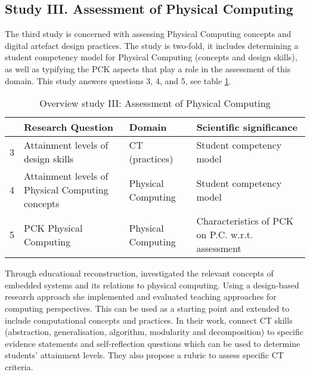 


\subsection{Study III. Assessment of Physical Computing} %

The third study is concerned with assessing Physical Computing concepts and digital artefact design practices. The study is two-fold, it includes determining a student competency model for Physical Computing (concepts and design skills), as well as typifying the PCK aspects that play a role in the assessment of this domain. This study answers questions 3, 4, and 5, see table \ref{table:StudyIIIresearchQues}.

\begin{table}
  \centering
\begin{tabular}{|c|p{50mm}|l|p{48mm}|}
   \hline
    &\textbf{Research Question} & \textbf{Domain} & \textbf{Scientific significance}\\
  \hline

  3 & Attainment levels of design skills & CT (practices) & Student competency model  \\ \hline
  4 & Attainment levels of Physical Computing concepts & Physical Computing & Student competency model\\ \hline
  5 & PCK Physical Computing & Physical Computing & Characteristics of PCK on P.C. w.r.t. assessment\\
  \hline
\end{tabular}
\caption{Overview study III: Assessment of Physical Computing}\label{table:StudyIIIresearchQues}
\end{table}



Through educational reconstruction, \citeauthor{mareen2018PhysComp} investigated the relevant concepts of embedded systems and its relations to physical computing. Using a design-based research approach she implemented and evaluated teaching approaches for computing perspectives. This can be used as a starting point and extended to include computational concepts and practices. In their work, \citeauthor{atmatzidou2012evaluating} connect CT skills (abstraction, generalisation, algorithm, modularity and decomposition) to specific evidence statements and self-reflection questions which can be used to determine students' attainment levels. They also propose a rubric to assess specific CT criteria.

